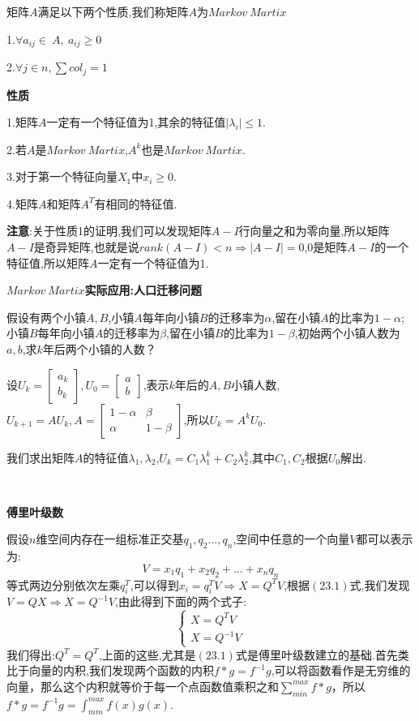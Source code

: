 \documentclass[oneside]{book}
\begin{document}
	矩阵$A$满足以下两个性质,我们称矩阵$A$为$Markov\ Martix$
	
	1.$\forall a_{ij}\in \ A,\ a_{ij}\geq0$
	
	2.$\forall j\in n,\sum col_{j}=1$
	
	\textbf{性质}
	
	1.矩阵$A$一定有一个特征值为1,其余的特征值$|\lambda_{i}|\le1$.
	
	2.若$A$是$Markov\ Martix$,$A^{k}$也是$Markov\ Martix$.
	
	3.对于第一个特征向量$X_{1}$中$x_{i}\ge 0$.
	
	4.矩阵$A$和矩阵$A^{T}$有相同的特征值.
	
	\textbf{注意}:关于性质1的证明,我们可以发现矩阵$A-I$行向量之和为零向量,所以矩阵$A-I$是奇异矩阵,也就是说$rank(A-I)<n\Rightarrow |A-I|=0$,0是矩阵$A-I$的一个特征值,所以矩阵$A$一定有一个特征值为1.
	
	$Markov\ Martix$\textbf{实际应用:人口迁移问题}
	
	假设有两个小镇$A,B$,小镇$A$每年向小镇$B$的迁移率为$\alpha$,留在小镇$A$的比率为$1-\alpha$;小镇$B$每年向小镇$A$的迁移率为$\beta$,留在小镇$B$的比率为$1-\beta$,初始两个小镇人数为$a,b$,求$k$年后两个小镇的人数？
	
	设$U_{k}=\left[\begin{array}{c}
		a_{k}\\b_{k}
	\end{array}\right],U_{0}=\left[\begin{array}{c}
	a\\b
\end{array}\right]$,表示$k$年后的$A,B$小镇人数,$U_{k+1}=AU_{k},A=\left[\begin{array}{cc}
1-\alpha&\beta\\\alpha&1-\beta
\end{array}\right]$,所以$U_{k}=A^{k}U_{0}$.

我们求出矩阵$A$的特征值$\lambda_{1},\lambda_{2}$,$U_{k}=C_{1}\lambda_{1}^{k}+C_{2}\lambda_{2}^{k}$,其中$C_{1},C_{2}$根据$U_{0}$解出.

\hspace{\fill}\

\textbf{傅里叶级数}

假设$n$维空间内存在一组标准正交基$q_{1},q_{2}...,q_{n}$,空间中任意的一个向量$V$都可以表示为:
\begin{equation}
V=x_{1}q_{1}+x_{2}q_{2}+...+x_{n}q_{n}\end{equation}
等式两边分别依次左乘$q_{i}^{T}$,可以得到$x_{i}=q_{i}^{T}V\Rightarrow X=Q^{T}V$,根据$(23.1)$式,我们发现$V=QX\Rightarrow X=Q^{-1}V$,由此得到下面的两个式子:
$$\left\{\begin{array}{c}
	X=Q^{T}V\\X=Q^{-1}V
\end{array}\right.$$
我们得出:$Q^{T}=Q^{T}$,上面的这些,尤其是$(23.1)$式是傅里叶级数建立的基础.首先类比于向量的内积,我们发现两个函数的内积$f*g=f^{-1}g$,可以将函数看作是无穷维的向量，那么这个内积就等价于每一个点函数值乘积之和$\sum_{min}^{max}f*g$，所以$f*g=f^{-1}g=\int_{min}^{max}f(x)g(x)$.
\end{document}
